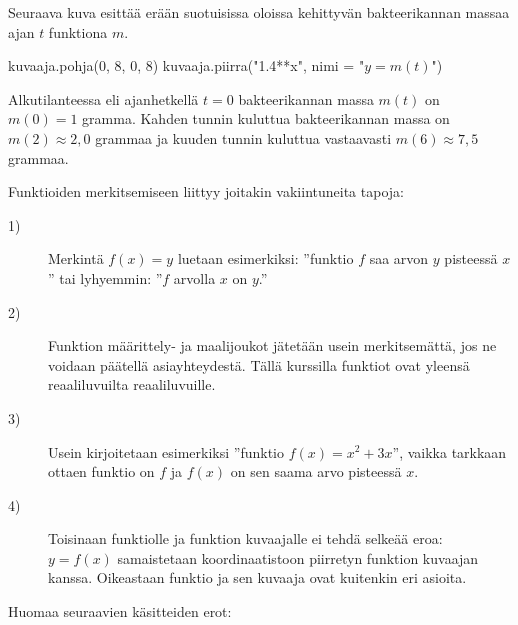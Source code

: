 \begin{esimerkki}
Seuraava kuva esittää erään suotuisissa oloissa kehittyvän bakteerikannan massaa ajan \(t\) funktiona $m$.

\begin{kuva}
    kuvaaja.pohja(0, 8, 0, 8)
    kuvaaja.piirra("1.4**x", nimi = "$y=m(t)$")
\end{kuva}

Alkutilanteessa eli ajanhetkellä \(t=0\) bakteerikannan massa \(m(t)\) on \(m(0)=1\) gramma. Kahden tunnin kuluttua bakteerikannan massa on \(m(2)\approx 2,0\) grammaa ja kuuden tunnin kuluttua vastaavasti \(m(6)\approx 7,5\) grammaa. 
\end{esimerkki}

Funktioiden merkitsemiseen liittyy joitakin vakiintuneita tapoja:
\begin{description}
	\item[1)] Merkintä $f(x) = y$ luetaan esimerkiksi: ''funktio \(f\) saa arvon $y$ pisteessä $x$'' tai lyhyemmin: ''\(f\) arvolla \(x\) on \(y\).''
	\item[2)] Funktion määrittely- ja maalijoukot jätetään usein merkitsemättä, jos ne voidaan päätellä asiayhteydestä.
		Tällä kurssilla funktiot ovat yleensä reaaliluvuilta reaaliluvuille.
	\item[3)] Usein kirjoitetaan esimerkiksi ''funktio $f(x) = x^2+3x$'', vaikka tarkkaan ottaen funktio on $f$ ja
		$f(x)$ on sen saama arvo pisteessä $x$.
	\item[4)] Toisinaan funktiolle ja funktion kuvaajalle ei tehdä selkeää eroa:
		$y = f(x)$ samaistetaan koordinaatistoon piirretyn funktion kuvaajan kanssa.
		Oikeastaan funktio ja sen kuvaaja ovat kuitenkin eri asioita.
\end{description}

Huomaa seuraavien käsitteiden erot:

